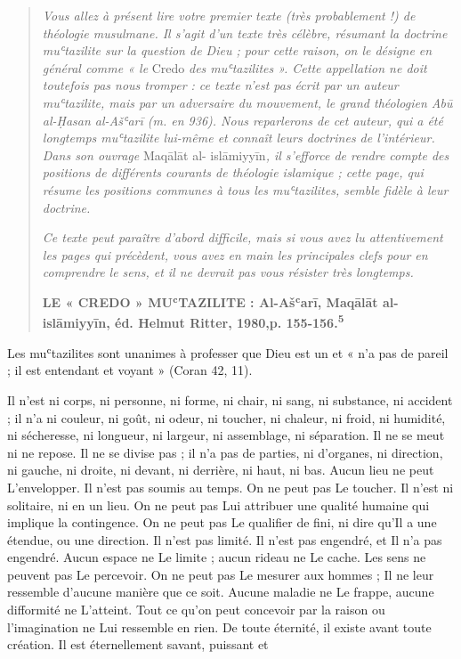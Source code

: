 \begin{quote}
\emph{Vous allez à présent lire votre premier texte (très probablement
!) de théologie musulmane. Il s'agit d'un texte très célèbre, résumant
la doctrine muʿtazilite sur la question de Dieu ; pour cette raison, on
le désigne en général comme « le} Credo \emph{des muʿtazilites ». Cette
appellation ne doit toutefois pas nous tromper : ce texte n'est pas
écrit par un auteur muʿtazilite, mais par un adversaire du mouvement, le
grand théologien Abū al-Ḥasan al-Ašʿarī (m. en 936). Nous reparlerons de
cet auteur, qui a été longtemps muʿtazilite lui-même et connaît leurs
doctrines de l'intérieur. Dans son ouvrage} Maqālāt al-
islāmiyyīn\emph{, il s'efforce de rendre compte des positions de
différents courants de théologie islamique ; cette page, qui résume les
positions communes à tous les muʿtazilites, semble fidèle à leur
doctrine.}

\emph{Ce texte peut paraître d'abord difficile, mais si vous avez lu
attentivement les pages qui précèdent, vous avez en main les principales
clefs pour en comprendre le sens, et il ne devrait pas vous résister
très longtemps.}

\textbf{LE « CREDO » MUʿTAZILITE : Al-Ašʿarī, Maqālāt al-islāmiyyīn, éd.
Helmut Ritter, 1980,p. 155-156.\textsuperscript{5}}
\end{quote}

Les muʿtazilites sont unanimes à professer que Dieu est un et « n'a pas
de pareil ; il est entendant et voyant » (Coran 42, 11).

Il n'est ni corps, ni personne, ni forme, ni chair, ni sang, ni
substance, ni accident ; il n'a ni couleur, ni goût, ni odeur, ni
toucher, ni chaleur, ni froid, ni humidité, ni sécheresse, ni longueur,
ni largeur, ni assemblage, ni séparation. Il ne se meut ni ne repose. Il
ne se divise pas ; il n'a pas de parties, ni d'organes, ni direction, ni
gauche, ni droite, ni devant, ni derrière, ni haut, ni bas. Aucun lieu
ne peut L'envelopper. Il n'est pas soumis au temps. On ne peut pas Le
toucher. Il n'est ni solitaire, ni en un lieu. On ne peut pas Lui
attribuer une qualité humaine qui implique la contingence. On ne peut
pas Le qualifier de fini, ni dire qu'Il a une étendue, ou une direction.
Il n'est pas limité. Il n'est pas engendré, et Il n'a pas engendré.
Aucun espace ne Le limite ; aucun rideau ne Le cache. Les sens ne
peuvent pas Le percevoir. On ne peut pas Le mesurer aux hommes ; Il ne
leur ressemble d'aucune manière que ce soit. Aucune maladie ne Le
frappe, aucune difformité ne L'atteint. Tout ce qu'on peut concevoir par
la raison ou l'imagination ne Lui ressemble en rien. De toute éternité,
il existe avant toute création. Il est éternellement savant, puissant et

